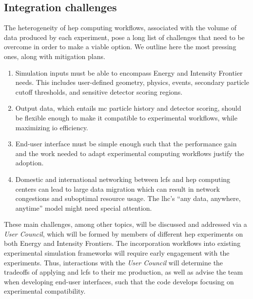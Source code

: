 \subsection{Integration challenges}

The heterogeneity of \ac{hep} computing workflows, associated with the volume of
data produced by each experiment, pose a long list of challenges that need to be
overcome in order to make \celeritas a viable option. We outline here the most
pressing ones, along with mitigation plans. 
\begin{enumerate}[itemsep=0pt]
  \item Simulation inputs must be able to encompass Energy and Intensity
    Frontier needs. This includes user-defined geometry, physics, events,
    secondary particle cutoff thresholds, and sensitive detector scoring
    regions.
  \item Output data, which entails \ac{mc} particle history and detector
    scoring, should be flexible enough to make it compatible to experimental
    workflows, while maximizing \ac{io} efficiency.
  \item End-user interface must be simple enough such that the performance gain
    and the work needed to adapt experimental computing workflows justify the
    adoption.
  \item Domestic and international networking between \acp{lcf} and \ac{hep}
    computing centers can lead to large data migration which can result in
    network congestions and suboptimal resource usage.  The \ac{lhc}'s ``any
    data, anywhere, anytime'' model \cite{hep-network-requirements} might need
    special attention.
\end{enumerate}

These main challenges, among other topics, will be discussed and addressed via a
\celeritas \emph{User Council}, which will be formed by members of different
\ac{hep} experiments on both Energy and Intensity Frontiers. The incorporation
\celeritas workflows into existing experimental simulation frameworks will
require early engagement with the experiments. Thus, interactions with the
\emph{User Council} will determine the tradeoffs of applying \celeritas and
\acp{lcf} to their \ac{mc} production, as well as advise the \celeritas team
when developing end-user interfaces, such that the code develops focusing on
experimental compatibility.

